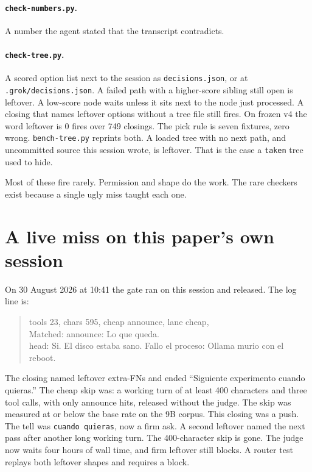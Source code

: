 \paragraph{\texttt{check-numbers.py}.}
A number the agent stated that the transcript contradicts.

\paragraph{\texttt{check-tree.py}.}
A scored option list next to the session as \texttt{decisions.json},
or at \texttt{.grok/decisions.json}. A failed path with a
higher-score sibling still open is leftover. A low-score node waits
unless it sits next to the node just processed. A closing that names
leftover options without a tree file still fires. On frozen v4 the
word leftover is 0 fires over 749 closings. The pick rule is seven
fixtures, zero wrong. \texttt{bench-tree.py} reprints both.
A loaded tree with no next path, and uncommitted source this session
wrote, is leftover. That is the case a \texttt{taken} tree used to hide.

Most of these fire rarely. Permission and shape do the work. The
rare checkers exist because a single ugly miss taught each one.


\section{A live miss on this paper's own session}
\label{app:livemiss}

On 30 August 2026 at 10:41 the gate ran on this session and
released. The log line is:

\begin{quote}
\ttfamily\footnotesize
tools 23, chars 595, cheap announce, lane cheap,\\
Matched: announce: Lo que queda.\\
head: Si. El disco estaba sano. Fallo el proceso: Ollama murio
con el reboot.
\end{quote}

The closing named leftover extra-FNs and ended ``Siguiente
experimento cuando quieras.'' The cheap skip was: a working turn
of at least 400 characters and three tool calls, with only
announce hits, released without the judge. The skip was measured
at or below the base rate on the 9B corpus. This closing was a
push. The tell was \texttt{cuando quieras}, now a firm ask. A
second leftover named the next pass after another long working
turn. The 400-character skip is gone. The judge now waits four
hours of wall time, and firm leftover still blocks. A router test
replays both leftover shapes and requires a block.

